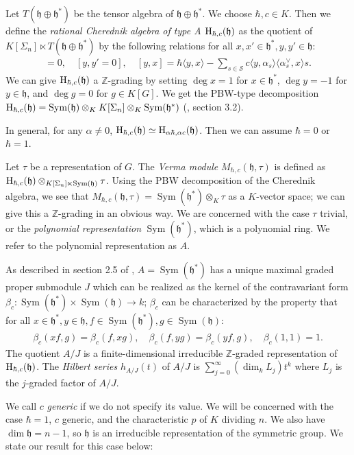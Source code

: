 \documentclass{article}
\numberwithin{equation}{section}
\newcommand{\h}{\mathfrak{h}}
\newcommand{\HH}{{\rm H}}
\newcommand{\Sym}{\operatorname{Sym}}
\begin{document}
Let $T(\h \oplus \h^*)$ be the tensor algebra of $\h \oplus \h^*$. We choose $\hbar,c \in K$. Then we define the {\it rational Cherednik algebra of type A $\HH_{\hbar,c}(\h)$} as the quotient of $K[\Sigma_n] \ltimes T(\h \oplus \h^*)$ by the following relations for all $x,x' \in \h^*, y,y' \in \h$:
\begin{align*}
[x,x']=0, \quad [y,y' = 0], \quad [y,x] = \hbar\langle y,x\rangle - \sum_{s \in \mathcal{S}} c\langle y,\alpha_s\rangle\langle \alpha_s^\vee,x\rangle s.
\end{align*}
We can give $\HH_{\hbar,c}(\h)$ a $\mathbb{Z}$-grading by setting $\deg x=1$ for $x \in \h^*$, $\deg y = -1$ for $y \in \h$, and $\deg g=0$ for $g \in K[G]$. We get the PBW-type decomposition $\HH_{\hbar,c}(\h)=\Sym(\h) \otimes_K K[\Sigma_n] \otimes_K \Sym(\h^*)$ (\cite{EM}, section 3.2). 

In general, for any $\alpha \ne 0$, $\HH_{\hbar,c}(\h)\simeq \HH_{\alpha\hbar,\alpha c}(\h)$. Then we can assume $\hbar=0$ or $\hbar = 1$. 

Let $\tau$ be a representation of $G$. The {\it Verma module} $M_{\hbar,c}(\h,\tau)$ is defined as $\HH_{\hbar,c}(\h) \otimes_{K[\Sigma_n] \ltimes \Sym(\h)} \tau$. Using the PBW decomposition of the Cherednik algebra, we see that $M_{\hbar,c}(\h,\tau)=\Sym(\h^*) \otimes_K \tau$ as a $K$-vector space; we can give this a $\mathbb{Z}$-grading in an obvious way. We are concerned with the case $\tau$ trivial, or the {\it polynomial representation} $\Sym(\h^*)$, which is a polynomial ring. We refer to the polynomial representation as $A$.

As described in section 2.5 of \cite{BC1}, $A=\Sym(\h^*)$ has a unique maximal graded proper submodule $J$ which can be realized as the kernel of the contravariant form $\beta_c: \Sym(\h^*) \times \Sym(\h) \to k$; $\beta_c$ can be characterized by the property that for all $x \in \h^*, y \in \h, f \in \Sym(\h^*), g \in  \Sym(\h)$:
\begin{align*}
\beta_c(xf,g)=\beta_c(f,xg), \quad \beta_c(f,yg) = \beta_c(yf,g), \quad \beta_c(1,1) = 1.
\end{align*}
The quotient $A/J$ is a finite-dimensional irreducible $\mathbb{Z}$-graded representation of $\HH_{\hbar,c}(\h)$. The {\it Hilbert series} $h_{A/J}(t)$ of $A/J$ is $\sum_{j=0}^\infty (\dim_k L_j)t^k$ where $L_j$ is the $j$-graded factor of $A/J$. 



 We call $c$ {\it generic} if we do not specify its value. We will be concerned with the case $\hbar=1$, $c$ generic, and the characteristic $p$ of $K$ dividing $n$. We also have $\dim \h = n-1$, so $\h$ is an irreducible representation of the symmetric group. We state our result for this case below:
 
\end{document}
